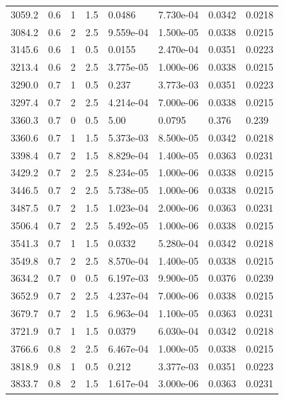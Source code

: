 \documentclass[preview]{standalone}
\begin{document}
{{{\begin{tabular}{L{1.2cm}C{1.2cm} C{0.3cm}C{0.5cm} C{1.4cm}C{1.4cm} C{1.4cm}C{1.4cm}}
  3059.2  &   0.6  & 1     & 1.5 &  0.0486  & 7.730e-04  & 0.0342 &  0.0218   \\ 
  3084.2  &   0.6  & 2     & 2.5 &  9.559e-04  & 1.500e-05  & 0.0338 &  0.0215   \\ 
  3145.6  &   0.6  & 1     & 0.5 &  0.0155  & 2.470e-04  & 0.0351 &  0.0223   \\ 
  3213.4  &   0.6  & 2     & 2.5 &  3.775e-05  & 1.000e-06  & 0.0338 &  0.0215   \\ 
  3290.0  &   0.7  & 1     & 0.5 &  0.237  & 3.773e-03  & 0.0351 &  0.0223   \\ 
  3297.4  &   0.7  & 2     & 2.5 &  4.214e-04  & 7.000e-06  & 0.0338 &  0.0215   \\ 
  3360.3  &   0.7  & 0     & 0.5 &  5.00  & 0.0795  & 0.376 &  0.239   \\ 
  3360.6  &   0.7  & 1     & 1.5 &  5.373e-03  & 8.500e-05  & 0.0342 &  0.0218   \\ 
  3398.4  &   0.7  & 2     & 1.5 &  8.829e-04  & 1.400e-05  & 0.0363 &  0.0231   \\ 
  3429.2  &   0.7  & 2     & 2.5 &  8.234e-05  & 1.000e-06  & 0.0338 &  0.0215   \\ 
  3446.5  &   0.7  & 2     & 2.5 &  5.738e-05  & 1.000e-06  & 0.0338 &  0.0215   \\ 
  3487.5  &   0.7  & 2     & 1.5 &  1.023e-04  & 2.000e-06  & 0.0363 &  0.0231   \\ 
  3506.4  &   0.7  & 2     & 2.5 &  5.492e-05  & 1.000e-06  & 0.0338 &  0.0215   \\ 
  3541.3  &   0.7  & 1     & 1.5 &  0.0332  & 5.280e-04  & 0.0342 &  0.0218   \\ 
  3549.8  &   0.7  & 2     & 2.5 &  8.570e-04  & 1.400e-05  & 0.0338 &  0.0215   \\ 
  3634.2  &   0.7  & 0     & 0.5 &  6.197e-03  & 9.900e-05  & 0.0376 &  0.0239   \\ 
  3652.9  &   0.7  & 2     & 2.5 &  4.237e-04  & 7.000e-06  & 0.0338 &  0.0215   \\ 
  3679.7  &   0.7  & 2     & 1.5 &  6.963e-04  & 1.100e-05  & 0.0363 &  0.0231   \\ 
  3721.9  &   0.7  & 1     & 1.5 &  0.0379  & 6.030e-04  & 0.0342 &  0.0218   \\ 
  3766.6  &   0.8  & 2     & 2.5 &  6.467e-04  & 1.000e-05  & 0.0338 &  0.0215   \\ 
  3818.9  &   0.8  & 1     & 0.5 &  0.212  & 3.377e-03  & 0.0351 &  0.0223   \\ 
  3833.7  &   0.8  & 2     & 1.5 &  1.617e-04  & 3.000e-06  & 0.0363 &  0.0231   \\ 

\end{tabular}}}}
\end{document}
